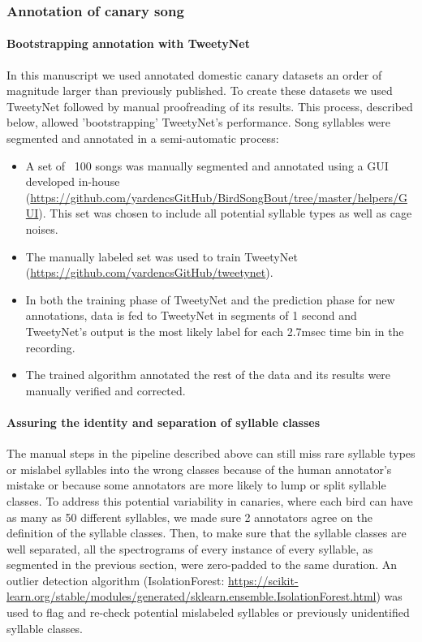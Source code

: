 \documentclass[9pt,lineno]{elife}
\begin{document}
\subsubsection{Annotation of canary song}
\label{methods:annot-canary}
\paragraph{Bootstrapping annotation with TweetyNet}
In this manuscript we used annotated domestic canary datasets an order of magnitude larger than previously published. To create these datasets we used TweetyNet followed by manual proofreading of its results. This process, described below, allowed 'bootstrapping' TweetyNet's performance.
\vspace{2mm}
\newline
Song syllables were segmented and annotated in a semi-automatic process:
\begin{itemize}
    \item A set of ~100 songs was manually segmented and annotated using a GUI developed in-house (\url{https://github.com/yardencsGitHub/BirdSongBout/tree/master/helpers/GUI}). This set was chosen to include all potential syllable types as well as cage noises.
    \item The manually labeled set was used to train TweetyNet (\url{https://github.com/yardencsGitHub/tweetynet}).
    \item In both the training phase of TweetyNet and the prediction phase for new annotations, data is fed to TweetyNet in segments of 1 second and TweetyNet’s output is the most likely label for each 2.7msec time bin in the recording.
    \item The trained algorithm annotated the rest of the data and its results were manually verified and corrected.
\end{itemize}

\paragraph{Assuring the identity and separation of syllable classes}
The manual steps in the pipeline described above can still miss rare syllable types or mislabel syllables into the wrong classes because of the human annotator's mistake or because some annotators are more likely to lump or split syllable classes. To address this potential variability in canaries, where each bird can have as many as 50 different syllables, we made sure 2 annotators agree on the definition of the syllable classes. Then, to make sure that the syllable classes are well separated, all the spectrograms of every instance of every syllable, as segmented in the previous section, were zero-padded to the same duration. An outlier detection algorithm (IsolationForest: \url{https://scikit-learn.org/stable/modules/generated/sklearn.ensemble.IsolationForest.html}) was used to flag and re-check potential mislabeled syllables or previously unidentified syllable classes.
\end{document}
